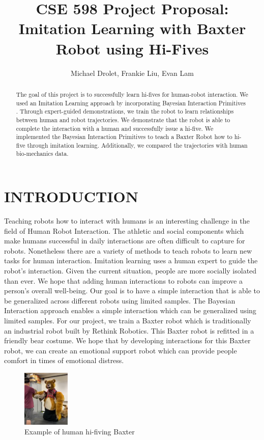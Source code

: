 \documentclass[letterpaper, 10 pt, conference]{ieeeconf}  %
\title{\LARGE \bf
CSE 598 Project Proposal: \\
Imitation Learning with Baxter Robot using Hi-Fives
}
\author{Michael Drolet, Frankie Liu, Evan Lam}
\begin{document}
\maketitle
\thispagestyle{empty}
\pagestyle{empty}


\begin{abstract}
The goal of this project is to successfully learn hi-fives for human-robot interaction. We used an Imitation Learning approach by incorporating Bayesian Interaction Primitives \cite{c1}. Through expert-guided demonstrations, we train the robot to learn relationships between human and robot trajectories. We demonstrate that the robot is able to complete the interaction with a human and successfully issue a hi-five. We implemented the Bayesian Interaction Primitives to teach a Baxter Robot how to hi-five through imitation learning. Additionally, we compared the trajectories with human bio-mechanics data.
\end{abstract}


\section{INTRODUCTION}
Teaching robots how to interact with humans is an interesting challenge in the field of Human Robot Interaction. The athletic and social components which make humans successful in daily interactions are often difficult to capture for robots. Nonetheless there are a variety of methods to teach robots to learn new tasks for human interaction. Imitation learning uses a human expert to guide the robot's interaction. Given the current situation, people are more socially isolated than ever. We hope that adding human interactions to robots can improve a person's overall well-being.
\newline
\indent Our goal is to have a simple interaction that is able to be generalized across different robots using limited samples. The Bayesian Interaction approach enables a simple interaction which can be generalized using limited samples.
\newline
\indent For our project, we train a Baxter robot which is traditionally an industrial robot built by Rethink Robotics. This Baxter robot is refitted in a friendly bear costume. We hope that by developing interactions for this Baxter robot, we can create an emotional support robot which can provide people comfort in times of emotional distress.
\newline
\begin{figure}[h]
\centering
\includegraphics[width=0.2\textwidth]{Bear.PNG}
\caption{Example of human hi-fiving Baxter}
\end{figure}
\end{document}
